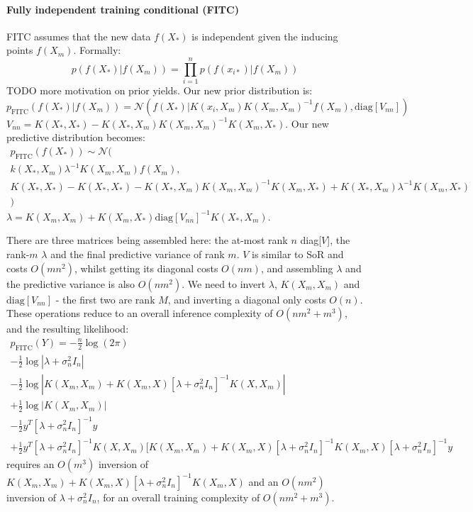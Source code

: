 \paragraph{Fully independent training conditional (FITC) \cite{fitc}}
FITC assumes that the new data $f(X_*)$ is independent given the inducing points $f(X_m)$. Formally:
\begin{equation*}
    p(f(X_*) | f(X_m)) = \prod_{i=1}^n p(f(x_{i*}) | f(X_m))
\end{equation*}
TODO more motivation on prior yields. Our new prior distribution is:
\begin{equation*}
    p_{\text{FITC}}(f(X_*) | f(X_m)) = \mathcal{N}(
    f(X_*) | K(x_i, X_m) K(X_m, X_m)^{-1} f(X_m),
    \text{diag}[V_{nn}] 
    )
\end{equation*}
$V_{nn} = K(X_*, X_*) - K(X_*, X_m) K(X_m, X_m)^{-1} K(X_m, X_*)$. Our new predictive distribution becomes:
\begin{equation*}
    \begin{aligned}
        p_{\text{FITC}}(f(X_*)) \sim \mathcal{N}( \\
        k(X_*, X_m) \lambda^{-1} K(X_m, X_m) f(X_m), \\
        K(X_*, X_*) - K(X_*, X_*) - K(X_*, X_m) K(X_m, X_m)^{-1} K(X_m, X_*) + K(X_*, X_m) \lambda^{-1} K(X_m, X_*) \\
        )
    \end{aligned}
\end{equation*}
$\lambda = K(X_m, X_m) + K(X_m, X_*) \text{diag}[V_{nn}]^{-1} K(X_*, X_m)$. 

There are three matrices being assembled here: the at-most rank $n$ diag[$V$], the rank-$m$ $\lambda$ and the final predictive variance of rank $m$. $V$ is similar to SoR and costs $O(mn^2)$, whilst getting its diagonal costs $O(nm)$, and assembling $\lambda$ and the predictive variance is also $O(nm^2)$. We need to invert $\lambda$, $K(X_m, X_m)$ and $\text{diag}[V_{nn}]$ - the first two are rank $M$, and inverting a diagonal only costs $O(n)$. These operations reduce to an overall inference complexity of $O(nm^2 + m^3)$, and the resulting likelihood:
\begin{equation*}
    \begin{aligned}
        p_{\text{FITC}}(Y) = -\frac{n}{2} \log(2 \pi) \\
        - \frac{1}{2} \log | \lambda + \sigma_n^2 I_n | \\
        - \frac{1}{2} \log | K(X_m, X_m) + K(X_m, X) [\lambda + \sigma_n^2 I_n]^{-1} K(X, X_m) | \\
        + \frac{1}{2} \log | K(X_m, X_m) | \\
        - \frac{1}{2} y^T [\lambda + \sigma_n^2 I_n]^{-1} y \\
        + \frac{1}{2} y^T [\lambda + \sigma_n^2 I_n]^{-1} K(X, X_m) [K(X_m, X_m) + K(X_m, X) [\lambda + \sigma_n^2 I_n]^{-1} K(X_m, X) [\lambda + \sigma_n^2 I_n]^{-1} y
    \end{aligned}
\end{equation*}
requires an $O(m^3)$ inversion of $K(X_m, X_m) + K(X_m, X) [\lambda + \sigma_n^2 I_n]^{-1} K(X_m, X)$ and an $O(nm^2)$ inversion of $\lambda + \sigma_n^2 I_n$, for an overall training complexity of $O(nm^2 + m^3)$.

